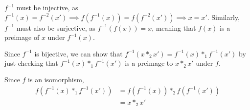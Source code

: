 \documentclass[12pt,letterpaper]{article}
\theoremstyle{definition}
\begin{document}
$f^{-1}$ must be injective, as $f^{-1}(x) = f^{-2}(x') \implies f(f^{-1}(x)) = f(f^{-2}(x')) \implies x = x'$. Similarly, $f^{-1}$ must also be surjective, as $f^{-1}(f(x)) = x$, meaning that $f(x)$ is a preimage of $x$ under $f^{-1}(x)$.

Since $f^{-1}$ is bijective, we can show that $f^{-1}(x *_2 x') = f^{-1}(x) *_1 f^{-1}(x')$ by just checking that $f^{-1}(x) *_1 f^{-1}(x')$ is a preimage to $x *_2 x'$ under $f$.

Since $f$ is an isomorphism,
\begin{align*}
  f(f^{-1}(x) *_1 f^{-1}(x')) &= f(f^{-1}(x)) *_2 f(f^{-1}(x')) \\
                              &= x *_2 x'
\end{align*}
\end{document}
